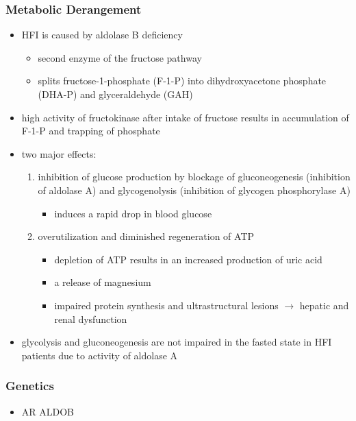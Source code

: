 \documentclass{scrartcl}
\begin{document}
\subsubsection{Metabolic Derangement}
\label{sec:org5d3c273}
\begin{itemize}
\item HFI is caused by aldolase B deficiency
\begin{itemize}
\item second enzyme of the fructose pathway
\item splits fructose-1-phosphate (F-1-P) into dihydroxyacetone phosphate (DHA-P) and glyceraldehyde (GAH)
\end{itemize}
\item high activity of fructokinase after intake of fructose results in
accumulation of F-1-P and trapping of phosphate
\item two major effects:
\begin{enumerate}
\item inhibition of glucose production by blockage of gluconeogenesis
(inhibition of aldolase A) and glycogenolysis (inhibition of glycogen phosphorylase A)
\begin{itemize}
\item induces a rapid drop in blood glucose
\end{itemize}
\item overutilization and diminished regeneration of ATP
\begin{itemize}
\item depletion of ATP results in an increased production of uric acid
\item a release of magnesium
\item impaired protein synthesis and ultrastructural lesions \(\to\)
hepatic and renal dysfunction
\end{itemize}
\end{enumerate}
\item glycolysis and gluconeogenesis are not impaired in the fasted state
in HFI patients due to activity of aldolase A
\end{itemize}

\subsubsection{Genetics}
\label{sec:orgb664c75}
\begin{itemize}
\item AR ALDOB
\end{itemize}
\end{document}
